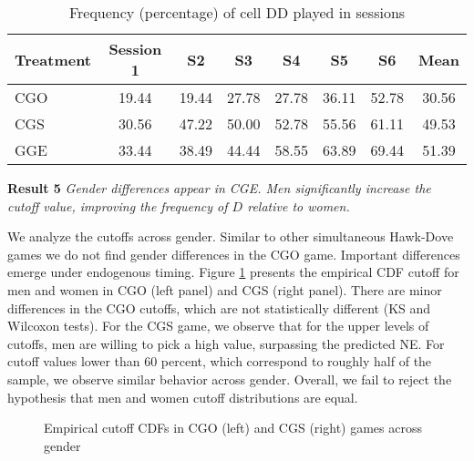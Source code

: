 \documentclass[12pt,english]{article}
\begin{document}
\begin{table}[!t]
\centering
\begin{tabular}{lccccccc}

Treatment & Session 1 & S2  & S3 & S4 & S5 & S6 & Mean\\
  \hline
  CGO &  19.44 & 19.44&  27.78 & 27.78 & 36.11 & 52.78 & 30.56 \\
  CGS & 30.56 & 47.22&  50.00 & 52.78 & 55.56 & 61.11 & 49.53\\
  GGE & 33.44 & 38.49 & 44.44 & 58.55 & 63.89 & 69.44 & 51.39 \\
  \hline

\end{tabular}
\caption{Frequency (percentage) of cell DD played in sessions }
\label{table:dd}
\end{table}

\noindent \textbf{Result 5}
\textit{Gender differences appear in CGE. Men significantly increase the cutoff value, improving the frequency of $D$ relative to women.}

We analyze the cutoffs across gender. Similar to other simultaneous Hawk-Dove games we do not find gender differences in the CGO game. Important differences emerge under endogenous timing. Figure \ref{fig:cdfgender1} presents the empirical CDF cutoff for men and women in CGO (left panel) and CGS (right panel). There are minor differences in the CGO cutoffs, which are not statistically different (KS and Wilcoxon tests). For the CGS game, we observe that for the upper levels of cutoffs, men are willing to pick a high value, surpassing the predicted NE. For cutoff values lower than 60 percent, which correspond to roughly half of the sample, we observe similar behavior across gender. Overall, we fail to reject the hypothesis that men and women cutoff distributions are equal.  

\begin{center}
\begin{figure}[ht]
\centering{}%
\begin{minipage}[t]{0.45\columnwidth}%
%
\end{minipage}%
\begin{minipage}[t]{0.45\columnwidth}%
%
\end{minipage} 
\caption{Empirical cutoff CDFs in CGO (left) and CGS (right) games across gender}
\label{fig:cdfgender1}\end{figure}
\par\end{center}
\end{document}
